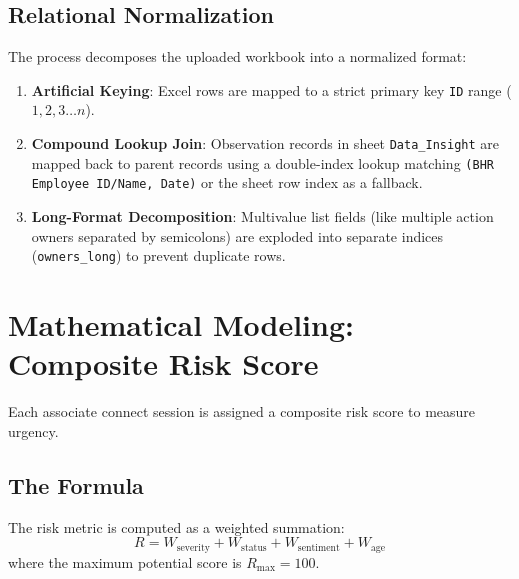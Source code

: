 \documentclass[11pt,a4paper]{article}
\begin{document}
\subsection{Relational Normalization}
The process decomposes the uploaded workbook into a normalized format:
\begin{enumerate}
    \item \textbf{Artificial Keying}: Excel rows are mapped to a strict primary key \texttt{ID} range ($1, 2, 3 \ldots n$).
    \item \textbf{Compound Lookup Join}: Observation records in sheet \texttt{Data\_Insight} are mapped back to parent records using a double-index lookup matching \texttt{(BHR Employee ID/Name, Date)} or the sheet row index as a fallback.
    \item \textbf{Long-Format Decomposition}: Multivalue list fields (like multiple action owners separated by semicolons) are exploded into separate indices (\texttt{owners\_long}) to prevent duplicate rows.
\end{enumerate}

\section{Mathematical Modeling: Composite Risk Score}
Each associate connect session is assigned a composite risk score to measure urgency.

\subsection{The Formula}
The risk metric is computed as a weighted summation:
\begin{equation}
    R = W_{\text{severity}} + W_{\text{status}} + W_{\text{sentiment}} + W_{\text{age}}
\end{equation}
where the maximum potential score is $R_{\text{max}} = 100$.
\end{document}

